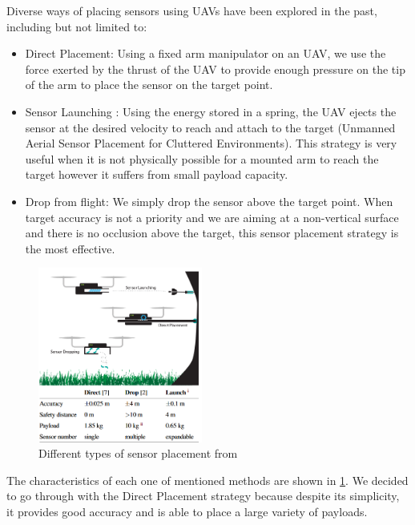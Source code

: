 Diverse ways of placing sensors using UAVs have been explored in the past, including but not limited to: 
\begin{itemize}
    \item Direct Placement: Using a fixed arm manipulator on an UAV, we use the force exerted by the thrust of the UAV to provide enough pressure on the tip of the arm to place the sensor on the target point.
    \item Sensor Launching \cite{farinha2020unmanned}: Using the energy stored in a spring, the UAV ejects the sensor at the desired velocity to reach and attach to the target (Unmanned Aerial Sensor Placement for Cluttered Environments). This strategy is very useful when it is not physically possible for a mounted arm to reach the target however it suffers from small payload capacity.
    \item Drop from flight: We simply drop the sensor above the target point. When target accuracy is not a priority and we are aiming at a non-vertical surface and there is no occlusion above the target,  this sensor placement strategy is the most effective. 
\end{itemize}
\begin{figure}[h!]
    \centering
    \includegraphics[width=0.48\textwidth]{Images/threeway.png}
    \caption{Different types of sensor placement from \cite{farinha2020unmanned}}
    \label{fig:threeway}
\end{figure}

The characteristics of each one of mentioned methods are shown in \ref{fig:threeway}.
We decided to go through with the Direct Placement strategy because despite its simplicity, it provides good accuracy and is able to place a large variety of payloads.\\

